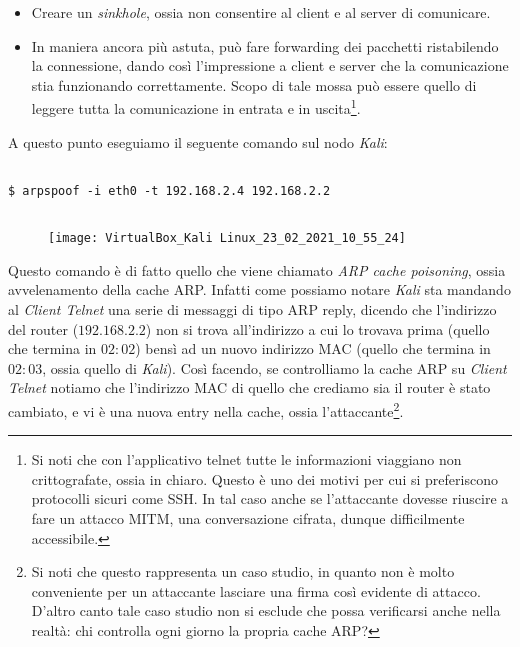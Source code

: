\documentclass[14pt]{extreport}
\begin{document}
\begin{itemize}
    \item Creare un \textit{sinkhole}, ossia non consentire al client e al server di comunicare.
    
    \item In maniera ancora più astuta, può fare forwarding dei pacchetti ristabilendo la connessione, dando così l'impressione a client e server che la comunicazione stia funzionando correttamente. Scopo di tale mossa può essere quello di leggere tutta la comunicazione in entrata e in uscita\footnote{Si noti che con l'applicativo telnet tutte le informazioni viaggiano non crittografate, ossia in chiaro. Questo è uno dei motivi per cui si preferiscono protocolli sicuri come SSH. In tal caso anche se l'attaccante dovesse riuscire a fare un attacco MITM,  una conversazione cifrata, dunque difficilmente accessibile.}.
\end{itemize}

A questo punto eseguiamo il seguente comando sul nodo \textit{Kali}:

\vspace{5pt}

{
\small
\begin{tcolorbox}

\begin{verbatim}

$ arpspoof -i eth0 -t 192.168.2.4 192.168.2.2
  
\end{verbatim}

\end{tcolorbox}
}

\vspace{5pt}

\begin{figure}[H]
\centering
\texttt{[image: VirtualBox\_Kali Linux\_23\_02\_2021\_10\_55\_24]}
\end{figure}



Questo comando è di fatto quello che viene chiamato \textit{ARP cache poisoning}, ossia avvelenamento della cache ARP. Infatti come possiamo notare \textit{Kali} sta mandando al \textit{Client Telnet} una serie di messaggi di tipo ARP reply, dicendo che l'indirizzo del router ($192.168.2.2$) non si trova all'indirizzo a cui lo trovava prima (quello che termina in $02:02$) bensì ad un nuovo indirizzo MAC (quello che termina in $02:03$, ossia quello di \textit{Kali}). Così facendo, se controlliamo la cache ARP su \textit{Client Telnet} notiamo che l'indirizzo MAC di quello che crediamo sia il router è stato cambiato, e vi è una nuova entry nella cache, ossia l'attaccante\footnote{Si noti che questo rappresenta un caso studio, in quanto non è molto conveniente per un attaccante lasciare una firma così evidente di attacco. D'altro canto tale caso studio non si esclude che possa verificarsi anche nella realtà: chi controlla ogni giorno la propria cache ARP?}.
\end{document}
